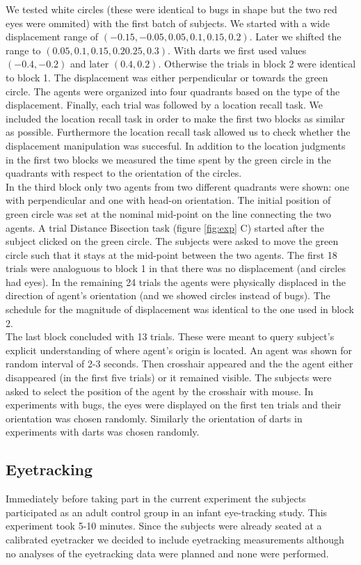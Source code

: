 \documentclass[10pt]{article}
\begin{document}
We tested white circles (these were identical to bugs in shape but the two red eyes were ommited) with the first batch of subjects. 
We started with a wide displacement range of $(-0.15, -0.05, 0.05, 0.1, 0.15, 0.2)$. 
Later we shifted the range to $(0.05, 0.1,0.15, 0.2 0.25,0.3)$. 
With darts we first used values $(-0.4, -0.2)$ and later $(0.4, 0.2)$. 
Otherwise the trials in block 2 were identical to block 1. 
The displacement was either perpendicular or towards the green circle. 
The agents were organized into four quadrants based on the type of the displacement. 
Finally, each trial was followed by a location recall task. 
We included the location recall task in order to make the first two blocks as similar as possible. 
Furthermore the location recall task allowed us to check whether the displacement manipulation was succesful.
In addition to the location judgments in the first two blocks we measured the time spent by the green circle in the quadrants with respect to the orientation of the circles.\\
In the third block only two agents from two different quadrants were shown: one with perpendicular and one with head-on orientation. 
The initial position of green circle was set at the nominal mid-point on the line connecting the two agents. 
A trial Distance Bisection task (figure \ref{fig:exp} C) started after the subject clicked on the green circle. 
The subjects were asked to move the green circle such that it stays at the mid-point between the two agents. 
The first 18 trials were analoguous to block 1 in that there was no displacement (and circles had eyes). 
In the remaining 24 trials the agents were physically displaced in the direction of agent's orientation (and we showed circles instead of bugs). 
The schedule for the magnitude of displacement was identical to the one used in block 2.\\
The last block concluded with 13 trials. 
These were meant to query subject's explicit understanding of where agent's origin is located. 
An agent was shown for random interval of 2-3 seconds. 
Then crosshair appeared and the the agent either disappeared (in the first five trials) or it remained visible. 
The subjects were asked to select the position of the agent by the crosshair with mouse. 
In experiments with bugs, the eyes were displayed on the first ten trials and their orientation was chosen randomly. 
Similarly the orientation of darts in experiments with darts was chosen randomly.\\
 
\subsection*{Eyetracking}
Immediately before taking part in the current experiment the subjects participated as an adult control group in an infant eye-tracking study. 
This experiment took 5-10 minutes. 
Since the subjects were already seated at a calibrated eyetracker we decided to include eyetracking measurements although no analyses of the eyetracking data were planned and none were performed.
\end{document}

